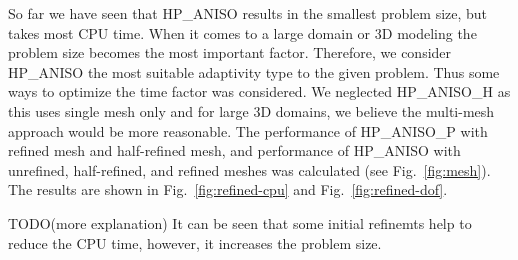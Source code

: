 So far we have seen that HP\_ANISO results in the smallest problem size, but takes
most CPU time. When it comes to a large domain or 3D modeling the problem
size becomes the most important factor. Therefore, we consider HP\_ANISO the most
suitable adaptivity type to the given problem. Thus some ways to optimize the time
factor was considered. We neglected HP\_ANISO\_H as this uses single mesh only
and for large 3D domains, we believe the multi-mesh approach would be
more reasonable. The performance of HP\_ANISO\_P with refined mesh and half-refined
mesh, and performance of HP\_ANISO with unrefined, half-refined, and refined
meshes was calculated (see Fig.~\ref{fig:mesh}).
The results are shown in Fig.~\ref{fig:refined-cpu} and Fig.~\ref{fig:refined-dof}.

TODO(more explanation) It can be seen that some initial refinemts help to reduce the CPU time,
however, it increases the problem size.

